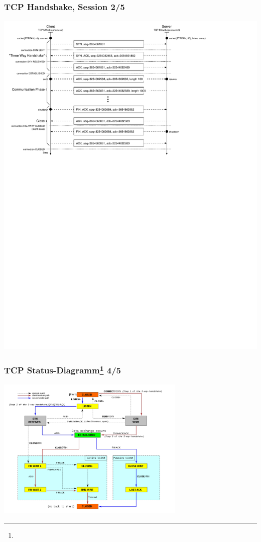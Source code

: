 \documentclass[ignorenonframetext]{beamer}
\begin{document}
\begin{frame}
\frametitle{TCP Handshake, Session 2/5}
\includegraphics[width=15cm]{tcp-handshake}
\end{frame}

\begin{frame}
\frametitle{TCP Status-Diagramm\footnote{} 4/5}
\begin{center}
\includegraphics[width=9cm]{tcp-state-diagram}
\end{center}
\end{frame}
\end{document}
